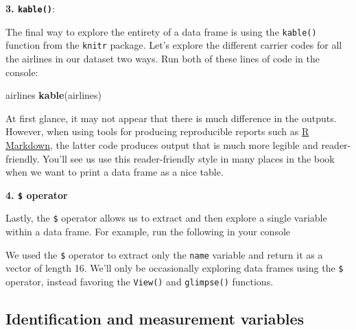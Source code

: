 \documentclass[]{book}
\newenvironment{Shaded}{\begin{snugshade}}{\end{snugshade}}
\newcommand{\KeywordTok}[1]{\textcolor[rgb]{0.13,0.29,0.53}{\textbf{#1}}}
\newcommand{\NormalTok}[1]{#1}
\newcommand{\OperatorTok}[1]{\textcolor[rgb]{0.81,0.36,0.00}{\textbf{#1}}}
\begin{document}
\begin{learncheck}
\vspace{-0.25in}
\vspace{-0.25in}
\end{learncheck}

\textbf{3. \texttt{kable()}}:

The final way to explore the entirety of a data frame is using the \texttt{kable()}  function from the  \texttt{knitr} package. Let's explore the different carrier codes for all the airlines in our dataset two ways. Run both of these lines of code in the console:

\begin{Shaded}
\begin{Highlighting}[]
\NormalTok{airlines}
\KeywordTok{kable}\NormalTok{(airlines)}
\end{Highlighting}
\end{Shaded}

At first glance, it may not appear that there is much difference in the outputs. However, when using tools for producing reproducible reports such as \href{http://rmarkdown.rstudio.com/lesson-1.html}{R Markdown}, the latter code produces output that is much more legible and reader-friendly. You'll see us use this reader-friendly style in many places in the book when we want to print a data frame as a nice table.

\textbf{4. \texttt{\$} operator}

Lastly, the \texttt{\$} operator  allows us to extract and then explore a single variable within a data frame. For example, run the following in your console

\begin{Shaded}
\end{Shaded}

We used the \texttt{\$} operator to extract only the \texttt{name} variable and return it as a vector of length 16. We'll only be occasionally exploring data frames using the \texttt{\$} operator, instead favoring the \texttt{View()} and \texttt{glimpse()} functions.

\hypertarget{identification-vs-measurement-variables}{%
\subsection{Identification and measurement variables}\label{identification-vs-measurement-variables}}
\end{document}
